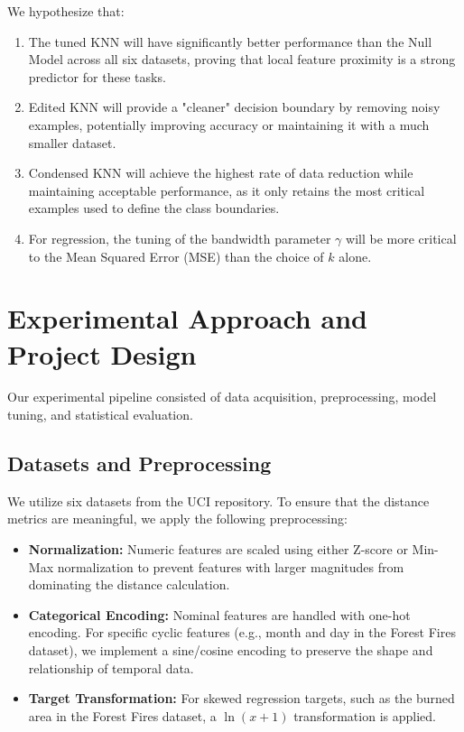 \documentclass[twoside,11pt]{article}
\begin{document}
We hypothesize that: 
\begin{enumerate}
    \item The tuned KNN will have significantly better performance than the Null Model across all six datasets, proving that local feature proximity is a strong predictor for these tasks.
    \item Edited KNN will provide a "cleaner" decision boundary by removing noisy examples, potentially improving accuracy or maintaining it with a much smaller dataset.
    \item Condensed KNN will achieve the highest rate of data reduction while maintaining acceptable performance, as it only retains the most critical examples used to define the class boundaries. 
    \item For regression, the tuning of the bandwidth parameter $\gamma$ will be more critical to the Mean Squared Error (MSE) than the choice of $k$ alone.
\end{enumerate}



\section{Experimental Approach and Project Design}
Our experimental pipeline consisted of data acquisition, preprocessing, model tuning, and statistical evaluation. 

\subsection{Datasets and Preprocessing}
We utilize six datasets from the UCI repository. To ensure that the distance metrics are meaningful, we apply the following preprocessing: 
\begin{itemize}
    \item  \textbf{Normalization:} Numeric features are scaled using either Z-score or Min-Max normalization to prevent features with larger magnitudes from dominating the distance calculation. 
    \item \textbf{Categorical Encoding:} Nominal features are handled with one-hot encoding. For specific cyclic features (e.g., month and day in the Forest Fires dataset), we implement a sine/cosine encoding to preserve the shape and relationship of temporal data.
    \item \textbf{Target Transformation:} For skewed regression targets, such as the burned area in the Forest Fires dataset, a $\ln(x+1)$ transformation is applied. 
\end{itemize}
\end{document}
